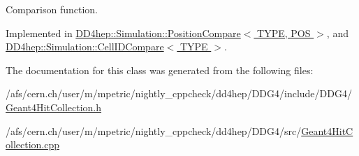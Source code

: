 Comparison function. 

Implemented in \hyperlink{class_d_d4hep_1_1_simulation_1_1_position_compare_a73ccac6277f2059df586125061ccce41}{DD4hep::Simulation::PositionCompare$<$ TYPE, POS $>$}, and \hyperlink{class_d_d4hep_1_1_simulation_1_1_cell_i_d_compare_af0477f875a7b24c338da10245a1a1253}{DD4hep::Simulation::CellIDCompare$<$ TYPE $>$}.

The documentation for this class was generated from the following files:\begin{DoxyCompactItemize}
\item 
/afs/cern.ch/user/m/mpetric/nightly\_\-cppcheck/dd4hep/DDG4/include/DDG4/\hyperlink{_geant4_hit_collection_8h}{Geant4HitCollection.h}\item 
/afs/cern.ch/user/m/mpetric/nightly\_\-cppcheck/dd4hep/DDG4/src/\hyperlink{_geant4_hit_collection_8cpp}{Geant4HitCollection.cpp}\end{DoxyCompactItemize}
